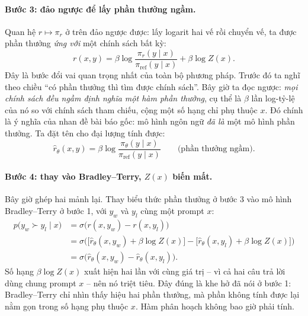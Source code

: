 \paragraph{Bước 3: đảo ngược để lấy phần thưởng ngầm.}
Quan hệ \( r \mapsto \pi_r \) ở trên đảo ngược được: lấy logarit hai vế rồi chuyển vế, ta được phần thưởng \emph{ứng với} một chính sách bất kỳ:
\[
    r(x,y) = \beta \log \frac{\pi_r(y \mid x)}{\pi_{\text{ref}}(y \mid x)} + \beta \log Z(x).
\]
Đây là bước đổi vai quan trọng nhất của toàn bộ phương pháp. Trước đó ta nghĩ theo chiều ``có phần thưởng thì tìm được chính sách''. Bây giờ ta đọc ngược: \emph{mọi chính sách đều ngầm định nghĩa một hàm phần thưởng}, cụ thể là \( \beta \) lần log-tỷ-lệ của nó so với chính sách tham chiếu, cộng một số hạng chỉ phụ thuộc \( x \). Đó chính là ý nghĩa của nhan đề bài báo gốc: mô hình ngôn ngữ \emph{đã là} một mô hình phần thưởng. Ta đặt tên cho đại lượng tính được:
\[
    \hat{r}_{\theta}(x,y) = \beta \log \frac{\pi_{\theta}(y \mid x)}{\pi_{\text{ref}}(y \mid x)}
    \qquad \text{(phần thưởng ngầm).}
\]

\paragraph{Bước 4: thay vào Bradley--Terry, \( Z(x) \) biến mất.}
Bây giờ ghép hai mảnh lại. Thay biểu thức phần thưởng ở bước 3 vào mô hình Bradley--Terry ở bước 1, với \( y_w \) và \( y_l \) cùng một prompt \( x \):
\[
\begin{aligned}
    p\big(y_w \succ y_l \mid x\big)
    &= \sigma\big( r(x,y_w) - r(x,y_l) \big) \\[4pt]
    &= \sigma\Big(
        \big[\hat{r}_{\theta}(x,y_w) + \beta \log Z(x)\big]
        - \big[\hat{r}_{\theta}(x,y_l) + \beta \log Z(x)\big]
    \Big) \\[4pt]
    &= \sigma\big( \hat{r}_{\theta}(x,y_w) - \hat{r}_{\theta}(x,y_l) \big).
\end{aligned}
\]
Số hạng \( \beta \log Z(x) \) xuất hiện hai lần với cùng giá trị -- vì cả hai câu trả lời dùng chung prompt \( x \) -- nên nó triệt tiêu. Đây đúng là khe hở đã nói ở bước 1: Bradley--Terry chỉ nhìn thấy hiệu hai phần thưởng, mà phần không tính được lại nằm gọn trong số hạng phụ thuộc \( x \). Hàm phân hoạch không bao giờ phải tính.

